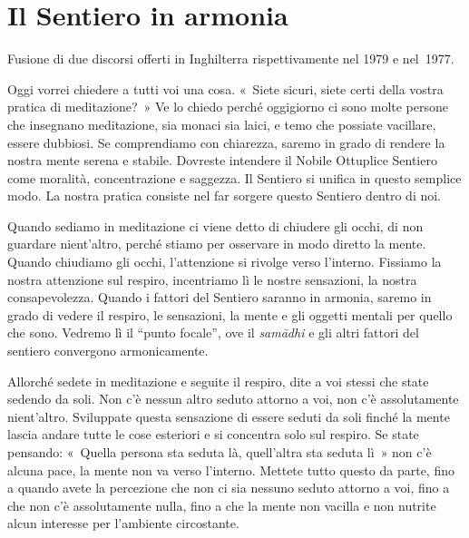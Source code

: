 \chapter{Il Sentiero in armonia}

\begin{openingQuote}
  \centering

  Fusione di due discorsi offerti in Inghilterra rispettivamente nel 1979 e
  nel~1977.
\end{openingQuote}

Oggi vorrei chiedere a tutti voi una cosa. «~Siete sicuri, siete certi
della vostra pratica di meditazione?~» Ve lo chiedo perché oggigiorno ci
sono molte persone che insegnano meditazione, sia monaci sia laici, e
temo che possiate vacillare, essere dubbiosi. Se comprendiamo con
chiarezza, saremo in grado di rendere la nostra mente serena e stabile.
Dovreste intendere il Nobile Ottuplice Sentiero come moralità,
concentrazione e saggezza. Il Sentiero si unifica in questo semplice
modo. La nostra pratica consiste nel far sorgere questo Sentiero dentro
di noi.

Quando sediamo in meditazione ci viene detto di chiudere gli occhi, di
non guardare nient'altro, perché stiamo per osservare in modo diretto la
mente. Quando chiudiamo gli occhi, l'attenzione si rivolge verso
l'interno. Fissiamo la nostra attenzione sul respiro, incentriamo lì le
nostre sensazioni, la nostra consapevolezza. Quando i fattori del
Sentiero saranno in armonia, saremo in grado di vedere il respiro, le
sensazioni, la mente e gli oggetti mentali per quello che sono. Vedremo
lì il ``punto focale'', ove il \emph{samādhi} e gli altri fattori del
sentiero convergono armonicamente.

Allorché sedete in meditazione e seguite il respiro, dite a voi stessi
che state sedendo da soli. Non c'è nessun altro seduto attorno a voi,
non c'è assolutamente nient'altro. Sviluppate questa sensazione di
essere seduti da soli finché la mente lascia andare tutte le cose
esteriori e si concentra solo sul respiro. Se state pensando: «~Quella
persona sta seduta là, quell'altra sta seduta lì~» non c'è alcuna pace,
la mente non va verso l'interno. Mettete tutto questo da parte, fino a
quando avete la percezione che non ci sia nessuno seduto attorno a voi,
fino a che non c'è assolutamente nulla, fino a che la mente non vacilla
e non nutrite alcun interesse per l'ambiente circostante.

